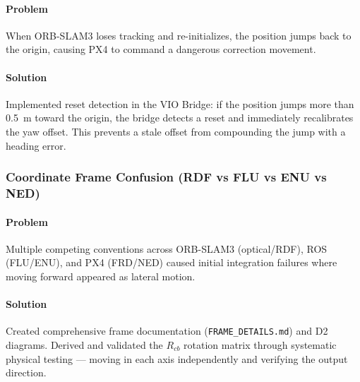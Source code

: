 \paragraph{Problem}
When ORB-SLAM3 loses tracking and re-initializes, the position jumps back to the origin, causing PX4 to command a dangerous correction movement.
\paragraph{Solution}
Implemented reset detection in the VIO Bridge: if the position jumps more than 0.5~m toward the origin, the bridge detects a reset and immediately recalibrates the yaw offset. This prevents a stale offset from compounding the jump with a heading error.

\subsubsection{Coordinate Frame Confusion (RDF vs FLU vs ENU vs NED)}
\paragraph{Problem}
Multiple competing conventions across ORB-SLAM3 (optical/RDF), ROS (FLU/ENU), and PX4 (FRD/NED) caused initial integration failures where moving forward appeared as lateral motion.
\paragraph{Solution}
Created comprehensive frame documentation (\texttt{FRAME\_DETAILS.md}) and D2 diagrams. Derived and validated the $R_{cb}$ rotation matrix through systematic physical testing --- moving in each axis independently and verifying the output direction.


